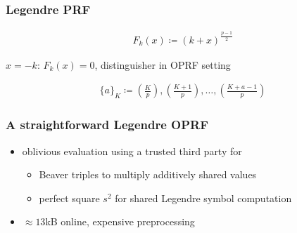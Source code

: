 \documentclass[aspectratio=169, 12pt,handout]{beamer}
\begin{document}
\begin{frame}
  \frametitle{Legendre PRF}
  \begin{definition}
    \begin{align*}
    F_k(x)\coloneqq (k+x)^{\frac{p-1}{2}}
    \end{align*}
  \end{definition}\pause
    $x=-k$: $F_k(x)=0$, distinguisher in OPRF setting\pause
   \begin{definition}
     \begin{align*}
       \{a\}_K\coloneqq
       \left(\frac{K}{p}\right),\left(\frac{K+1}{p}\right),\ldots,\left(\frac{K+a-1}{p}\right)
     \end{align*}
   \end{definition}
\end{frame}


\begin{frame}
  \frametitle{A straightforward Legendre OPRF~\cite{SerHorBur23}}
  \begin{itemize}
    \item oblivious evaluation using a trusted third party for 
  \begin{itemize}
    \item Beaver triples to multiply additively shared values
    \item perfect square $s^2$ for shared Legendre symbol computation
  \end{itemize}
    \item $\approx 13$kB online, expensive preprocessing
  \end{itemize}
\end{frame}

\end{document}
